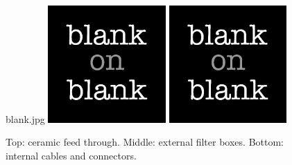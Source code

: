\begin{figure}[!ht]
  {blank.jpg}
  \includegraphics[width=0.4\textwidth]
  {blank.jpg}
  \includegraphics[width=0.4\textwidth]
  {blank.jpg}
  \caption{Top: ceramic feed through. Middle: external filter boxes. Bottom: internal cables and connectors.}
  \label{fig: gas detector hv connector}
\end{figure}

